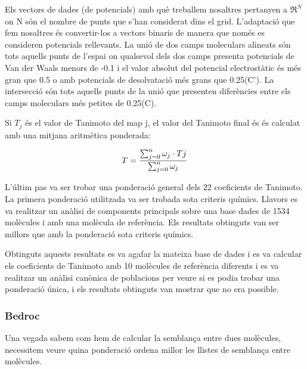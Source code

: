 Els vectors de dades (de potencials) amb què treballem nosaltres
pertanyen a $\Re^{N}$ on N són el nombre de punts que s'han considerat
dins el grid. L'adaptació que fem nosaltres és convertir-los a vectors
binaris de manera que només es consideren potencials rellevants. La
unió de dos camps moleculars alineats són tots aquells punts de
l'espai on qualsevol dels dos camps presenta potencials de Van der
Waals menors de -0.1 i el valor absolut del potencial electrostàtic és
més gran que 0.5 o amb potencials de desolvatació més grans que
0.25(C'). La intersecció són tots aquells punts de la unió que
presenten diferències entre els camps moleculars més petites de
0.25(C). 



Si $T_{j}$ és el valor de Tanimoto del map j, el valor del Tanimoto final és és
calculat amb una mitjana aritmètica ponderada:

$$T={\sum_{j=0}^{n} \omega_{j}\cdot T{j} \over \sum_{j=0}^{n} \omega_{j}}$$

L'últim pas va ser trobar una ponderació general dels 22 coeficients
de Tanimoto. La primera ponderació utilitzada va ser trobada sota
criteris químics. Llavors es va realitzar un anàlisi de components
principals sobre una base dades de 1534 molècules i amb una molècula
de referència. Els resultats obtinguts van ser millors que amb la
ponderació sota criteris químics.

Obtinguts aquests resultats es va agafar la mateixa base de dades i es
va calcular els coeficients de Tanimoto amb 10 molècules de referència
diferents i es va realitzar un anàlisi canònica de poblacions per
veure si es podia trobar una ponderació única, i els resultats
obtinguts van mostrar que no era possible. 


\subsubsection{Bedroc}
\label{ssub:Bedroc}
Una vegada sabem com hem de calcular la semblança entre dues molècules, 
necessitem veure quina ponderació ordena millor les llistes de semblança entre
molècules.


